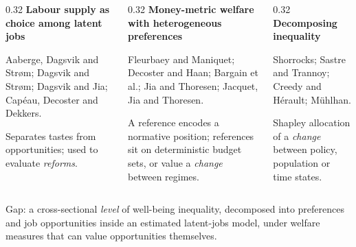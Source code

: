 \documentclass[10pt,aspectratio=169]{beamer}
\renewcommand{\caveat}[1]{{\fontsize{8.2}{10}\selectfont\raggedright\color{deepred}#1\par}}
\begin{document}
\begin{frame}
\vfill
\begin{columns}[T]
\begin{column}{0.32\textwidth}
{\bfseries Labour supply as choice among latent jobs}\par\smallskip
{\footnotesize Aaberge, Dagsvik and Str{\o}m; Dagsvik and Str{\o}m; Dagsvik and
Jia; Cap\'eau, Decoster and Dekkers.\par\smallskip
Separates tastes from opportunities; used to evaluate \emph{reforms}.\par}
\end{column}
\begin{column}{0.32\textwidth}
{\bfseries Money-metric welfare with heterogeneous preferences}\par\smallskip
{\footnotesize Fleurbaey and Maniquet; Decoster and Haan; Bargain et al.;
Jia and Thoresen; Jacquet, Jia and Thoresen.\par\smallskip
A reference encodes a normative position; references sit on deterministic
budget sets, or value a \emph{change} between regimes.\par}
\end{column}
\begin{column}{0.32\textwidth}
{\bfseries Decomposing inequality}\par\smallskip
{\footnotesize Shorrocks; Sastre and Trannoy; Creedy and H\'erault; M\"uhlhan.\par\smallskip
Shapley allocation of a \emph{change} between policy, population or time
states.\par}
\end{column}
\end{columns}
\vfill
\caveat{Gap: a cross-sectional \emph{level} of well-being inequality, decomposed
into preferences and job opportunities inside an estimated latent-jobs model,
under welfare measures that can value opportunities themselves.}
\end{frame}
\end{document}
